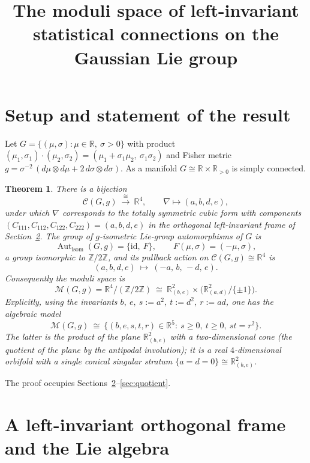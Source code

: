 \documentclass{amsart}
\newtheorem{theorem}{Theorem}
\theoremstyle{definition}
\theoremstyle{remark}
\begin{document}
\title{The moduli space of left-invariant statistical connections on the Gaussian Lie group}
\maketitle

\section{Setup and statement of the result}

Let $G=\{(\mu,\sigma):\mu\in\mathbb{R},\ \sigma>0\}$ with product
$(\mu_1,\sigma_1)\cdot(\mu_2,\sigma_2)=(\mu_1+\sigma_1\mu_2,\ \sigma_1\sigma_2)$ and Fisher metric
$g=\sigma^{-2}\,(d\mu\otimes d\mu+2\,d\sigma\otimes d\sigma)$.
As a manifold $G\cong\mathbb{R}\times\mathbb{R}_{>0}$ is simply connected.

\begin{theorem}\label{thm:main}
There is a bijection
\[
\mathcal{C}(G,g)\ \xrightarrow{\ \cong\ }\ \mathbb{R}^4,\qquad \nabla\longmapsto (a,b,d,e),
\]
under which $\nabla$ corresponds to the totally symmetric cubic form with components
$(C_{111},C_{112},C_{122},C_{222})=(a,b,d,e)$ in the orthogonal left-invariant frame of
Section~\ref{sec:frame}. The group of $g$-isometric Lie-group automorphisms of $G$ is
\[
\operatorname{Aut}_{\mathrm{isom}}(G,g)=\{\mathrm{id},\ F\},\qquad F(\mu,\sigma)=(-\mu,\sigma),
\]
a group isomorphic to $\mathbb{Z}/2\mathbb{Z}$, and its pullback action on $\mathcal{C}(G,g)\cong\mathbb{R}^4$ is
\begin{equation}\label{eq:action}
(a,b,d,e)\ \longmapsto\ (-a,\,b,\,-d,\,e).
\end{equation}
Consequently the moduli space is
\[
\mathcal{M}(G,g)=\mathbb{R}^4/(\mathbb{Z}/2\mathbb{Z})
\ \cong\ \mathbb{R}^2_{(b,e)}\times\bigl(\mathbb{R}^2_{(a,d)}/\{\pm 1\}\bigr).
\]
Explicitly, using the invariants $b,\ e,\ s:=a^2,\ t:=d^2,\ r:=ad$, one has the algebraic model
\[
\mathcal{M}(G,g)\ \cong\ \bigl\{(b,e,s,t,r)\in\mathbb{R}^5:\ s\ge 0,\ t\ge 0,\ st=r^2\bigr\}.
\]
The latter is the product of the plane $\mathbb{R}^2_{(b,e)}$ with a two-dimensional cone (the quotient of the
plane by the antipodal involution); it is a real $4$-dimensional orbifold with a single conical singular
stratum $\{a=d=0\}\cong\mathbb{R}^2_{(b,e)}$.
\end{theorem}

The proof occupies Sections~\ref{sec:frame}--\ref{sec:quotient}.

\section{A left-invariant orthogonal frame and the Lie algebra}\label{sec:frame}
\end{document}
